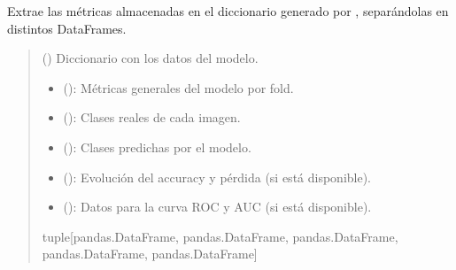 \documentclass[letterpaper,10pt,spanish]{sphinxmanual}
\begin{document}
\label{\detokenize{Funciones_Visualizacion:module-leer_metricas}}

\begin{fulllineitems}
\label{\detokenize{Funciones_Visualizacion:leer_metricas.get_data}}
\pysigstartsignatures
\pysiglinewithargsret
{}
{}
{}
\pysigstopsignatures
\sphinxAtStartPar
Extrae las métricas almacenadas en el diccionario generado por , 
separándolas en distintos DataFrames.
\begin{quote}\begin{description}
\sphinxAtStartPar
{} (\sphinxstyleliteralemphasis{\sphinxupquote{{[}}}\sphinxstyleliteralemphasis{\sphinxupquote{, }}\sphinxstyleliteralemphasis{\sphinxupquote{{]}}}) \textendash{} Diccionario con los datos del modelo.

\sphinxAtStartPar
\begin{itemize}
\item {} 
\sphinxAtStartPar
{} (): Métricas generales del modelo por fold.

\item {} 
\sphinxAtStartPar
{} (): Clases reales de cada imagen.

\item {} 
\sphinxAtStartPar
{} (): Clases predichas por el modelo.

\item {} 
\sphinxAtStartPar
{} (): Evolución del accuracy y pérdida (si está disponible).

\item {} 
\sphinxAtStartPar
{} (): Datos para la curva ROC y AUC (si está disponible).

\end{itemize}


\sphinxAtStartPar
tuple{[}pandas.DataFrame, pandas.DataFrame, pandas.DataFrame, pandas.DataFrame, pandas.DataFrame{]}

\end{description}\end{quote}

\end{fulllineitems}
\end{document}
